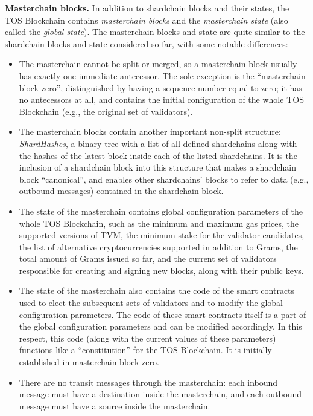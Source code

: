 \documentclass[12pt,oneside]{article}
\def\makepoint#1{\medbreak\noindent{\bf #1.\ }}
\def\nxsubpoint{\refstepcounter{subsubsection}%
  \smallbreak\makepoint{\thesubsubsection}}
\def\emb#1{\textbf{#1.}}
\begin{document}
\nxsubpoint\emb{Masterchain blocks}
In addition to shardchain blocks and their states, the TOS Blockchain contains {\em masterchain blocks\/} and the {\em masterchain state\/} (also called the {\em global state}). The masterchain blocks and state are quite similar to the shardchain blocks and state considered so far, with some notable differences:
\begin{itemize}
\item The masterchain cannot be split or merged, so a masterchain block usually has exactly one immediate antecessor. The sole exception is the ``masterchain block zero'', distinguished by having a sequence number equal to zero; it has no antecessors at all, and contains the initial configuration of the whole TOS Blockchain (e.g., the original set of validators).
\item The masterchain blocks contain another important non-split structure: {\em ShardHashes}, a binary tree with a list of all defined shardchains along with the hashes of the latest block inside each of the listed shardchains. It is the inclusion of a shardchain block into this structure that makes a shardchain block ``canonical'', and enables other shardchains' blocks to refer to data (e.g., outbound messages) contained in the shardchain block.
\item The state of the masterchain contains global configuration parameters of the whole TOS Blockchain, such as the minimum and maximum gas prices, the supported versions of TVM, the minimum stake for the validator candidates, the list of alternative cryptocurrencies supported in addition to Grams, the total amount of Grams issued so far, and the current set of validators responsible for creating and signing new blocks, along with their public keys.
\item The state of the masterchain also contains the code of the smart contracts used to elect the subsequent sets of validators and to modify the global configuration parameters. The code of these smart contracts itself is a part of the global configuration parameters and can be modified accordingly. In this respect, this code (along with the current values of these parameters) functions like a ``constitution'' for the TOS Blockchain. It is initially established in masterchain block zero.
\item There are no transit messages through the masterchain: each inbound message must have a destination inside the masterchain, and each outbound message must have a source inside the masterchain.
\end{itemize}
\end{document}

